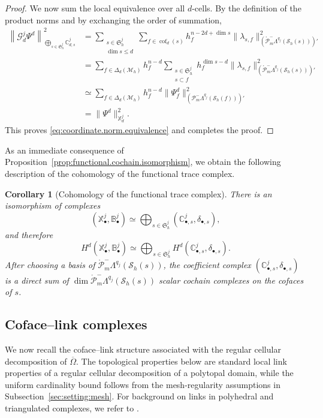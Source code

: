 \documentclass[a4paper,11pt]{article}
\newtheorem{corollary}[theorem]{Corollary}
\theoremstyle{definition}
\newcommand{\Mh}{\mathcal{M}_h}
\newcommand{\Sh}{\mathcal{S}_h}
\newcommand{\FM}[1]{\Delta_{#1}}
\newcommand{\cof}[1]{\operatorname{cof}_{#1}}
\newcommand{\PLtrim}[2]{\mathcal{P}_{#1}^{-}\Lambda^{#2}}
\newcommand{\PLtrimz}[2]{\mathring{\mathcal P}_{#1}^{-}\Lambda^{#2}}
\begin{document}
\begin{proof}
We now sum the local equivalence over all $d$-cells.
By the definition of the product norms and by exchanging the order of summation,
\[
\begin{aligned}
\left\|
  \mathcal G_d^j\Psi^d
\right\|_{
  \bigoplus_{s\in\mathfrak S_h^j}
  \mathbb C_{d,s}^j
}^2
&=
\sum_{\substack{
  s\in\mathfrak S_h^j\\
  \dim s\leq d
}}
\sum_{f\in\cof{d}(s)}
h_f^{n-2d+\dim s}
\|\lambda_{s,f}\|_{
  \left(
    \PLtrimz{m}{q_j}(\Sh(s))
  \right)'
}^2
\\
&=
\sum_{f\in\FM{d}(\Mh)}
h_f^{n-d}
\sum_{\substack{
  s\in\mathfrak S_h^j\\
  s\subset f
}}
h_f^{\dim s-d}
\|\lambda_{s,f}\|_{
  \left(
    \PLtrimz{m}{q_j}(\Sh(s))
  \right)'
}^2
\\
&\simeq
\sum_{f\in\FM{d}(\Mh)}
h_f^{n-d}
\|\Psi_f^d\|_{
  \left(
    \PLtrim{m}{q_j}(\Sh(f))
  \right)'
}^2
\\
&=
\|\Psi^d\|_{\mathbb X_d^j}^2.
\end{aligned}
\]
This proves \eqref{eq:coordinate.norm.equivalence} and completes the proof.
\end{proof}

As an immediate consequence of Proposition~\ref{prop:functional.cochain.isomorphism}, we obtain the following description of the cohomology of the functional trace complex.
\begin{corollary}[Cohomology of the functional trace complex]
\label{cor:functional.cohomology}
There is an isomorphism of complexes
\[
\left(
\mathbb X_\bullet^j,\mathbb B_\bullet^j
\right)
\simeq
\bigoplus_{s\in\mathfrak S_h^j}
\left(
\mathbb C_{\bullet,s}^j,\delta_{\bullet,s}
\right),
\]
and therefore
\[
H^d
\left(
\mathbb X_\bullet^j,\mathbb B_\bullet^j
\right)
\simeq
\bigoplus_{s\in\mathfrak S_h^j}
H^d
\left(
\mathbb C_{\bullet,s}^j,\delta_{\bullet,s}
\right).
\]
After choosing a basis of $\PLtrimz{m}{q_j}(\Sh(s))$, the coefficient complex $\left( \mathbb C_{\bullet,s}^j,\delta_{\bullet,s}\right)$ is a direct sum of $\dim\PLtrimz{m}{q_j}(\Sh(s))$ scalar cochain complexes on the cofaces of $s$.
\end{corollary}

\subsection{Coface--link complexes}
\label{subsubsec:coface.link.complexes}

We now recall the coface--link structure associated with the regular cellular decomposition of $\overline\Omega$.
The topological properties below are standard local link properties of a regular cellular decomposition of a polytopal domain, while the uniform cardinality bound follows from the mesh-regularity assumptions in Subsection~\ref{sec:setting:mesh}.
For background on links in polyhedral and triangulated complexes, we refer to \cite[Sections~2.2.4 and~2.3.2]{Kozlov:08}.
\end{document}

